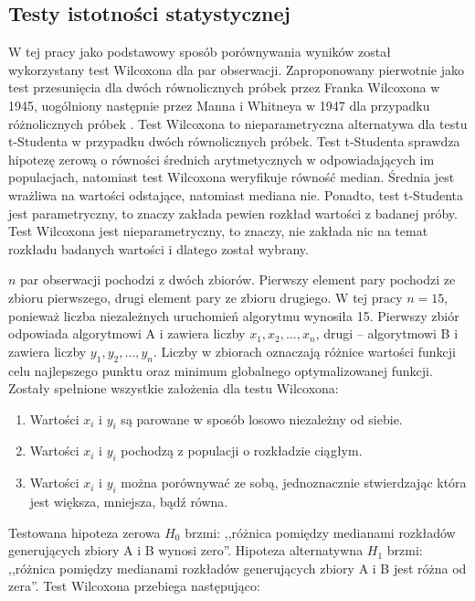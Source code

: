 \documentclass[a4paper,onecolumn,oneside,12pt,wide,floatssmall]{mwrep}
\theoremstyle{definition}
\theoremstyle{plain}%
\theoremstyle{remark}
\begin{document}
\subsection{Testy istotności statystycznej}
\label{section:testy_istotnosci}

W tej pracy jako podstawowy sposób porównywania wyników został wykorzystany test 
Wilcoxona dla par obserwacji. Zaproponowany pierwotnie jako test przesunięcia dla dwóch równolicznych 
próbek przez Franka Wilcoxona w 1945, uogólniony następnie przez Manna i Whitneya w 1947
dla przypadku różnolicznych próbek \cite{mann}. Test Wilcoxona to nieparametryczna alternatywa dla testu t-Studenta w 
przypadku dwóch równolicznych próbek. Test t-Studenta sprawdza hipotezę zerową o równości
średnich arytmetycznych w odpowiadających im populacjach, natomiast test Wilcoxona
weryfikuje równość median. Średnia jest wrażliwa na wartości odstające,
natomiast mediana nie. Ponadto, test t-Studenta jest parametryczny, to znaczy zakłada pewien rozkład
wartości z badanej próby. Test Wilcoxona jest nieparametryczny, to znaczy,
nie zakłada nic na temat rozkładu badanych wartości i dlatego został wybrany.

$n$ par obserwacji pochodzi z dwóch zbiorów. Pierwszy element pary pochodzi ze zbioru pierwszego, drugi element pary 
ze zbioru drugiego. W tej pracy $n=15$,
ponieważ liczba niezależnych uruchomień algorytmu wynosiła 15. Pierwszy zbiór odpowiada algorytmowi A i zawiera
liczby $x_1, x_2, \dots, x_{n}$, drugi -- algorytmowi B i zawiera liczby $y_1, y_2, \dots, y_{n}$. 
Liczby w zbiorach oznaczają różnice wartości funkcji celu najlepszego punktu oraz minimum globalnego
optymalizowanej funkcji. Zostały spełnione wszystkie założenia dla testu Wilcoxona:

\begin{enumerate}
 \item Wartości $x_i$ i $y_i$ są parowane w sposób losowo niezależny od siebie. 
 \item Wartości $x_i$ i $y_i$ pochodzą z populacji o rozkładzie ciągłym.
 \item Wartości $x_i$ i $y_i$ można porównywać ze sobą, jednoznacznie stwierdzając która jest większa, mniejsza,
bądź równa.
\end{enumerate}

Testowana hipoteza zerowa $H_0$ brzmi: ,,różnica pomiędzy medianami rozkładów generujących zbiory A i B wynosi zero''.
Hipoteza alternatywna $H_1$ brzmi: ,,różnica pomiędzy medianami rozkładów generujących zbiory A i B jest różna od zera''.
Test Wilcoxona przebiega następująco:
\end{document}
